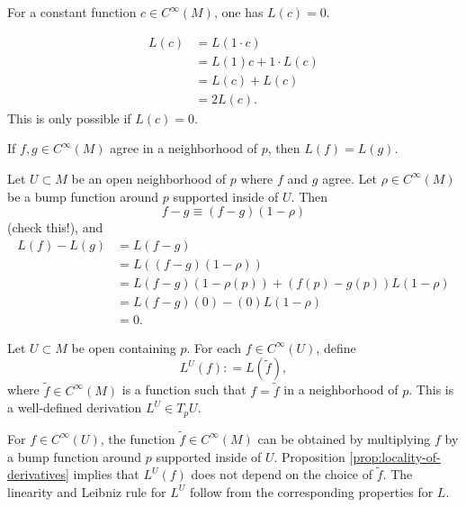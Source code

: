 \documentclass{ximera}
\begin{document}
    \begin{proposition}
        For a constant function $c \in C^{\infty}(M)$, one has $L (c) = 0$. 

    \begin{solution}
        \begin{align*}
            L(c) & = L ( 1 \cdot c) \\
            & = L (1) c + 1 \cdot  L (c) \\
            & =  L (c) +  L (c) \\
            & = 2 L (c) .
        \end{align*}
        This is only possible if $L(c) = 0$.
    \end{solution}
    \end{proposition}
    
    \begin{proposition}[Locality] \label{prop:locality-of-derivatives}
        If $f,g \in C^{\infty} (M)$ agree in a neighborhood of $p$, then $L(f) = L (g)$.
    \begin{solution}
        Let $U \subset M$ be an open neighborhood of $p$ where $f$ and $g$ agree. Let $\rho \in C^{\infty} (M)$ be a bump function around $p$ supported inside of $U$. Then 
        \[ f-g \equiv (f -g) ( 1 - \rho ) \] 
        (check this!), and
        \begin{align*}
            L( f) - L (g) & = L (f-g) \\
            & = L ((f - g) ( 1 - \rho ) ) \\
            & = L (f-g) ( 1 - \rho (p) )  + (f(p) - g(p)) L(1 - \rho) \\
            & = L(f-g) (0) - (0) L (1 - \rho ) \\
            & = 0. 
        \end{align*}
    \end{solution} 
    \end{proposition}

    \begin{proposition}\label{prop:restriction-of-derivatives}
        Let $ U \subset M$ be open containing $p$. For each $f\in C^{\infty}(U)$, define 
        \[   L^U (f) : = L (\tilde{f}) ,     \]
        where $\tilde{f} \in C^{\infty} (M) $ is a function such that $f = \tilde{f} $ in a neighborhood of $p$. This is a well-defined derivation $L^U  \in T_p U $.

    \begin{solution}
        For $f \in C^{\infty} (U)$, the function $\tilde{f} \in C^{\infty}(M)$ can be obtained by multiplying $f$ by a bump function around $p$ supported inside of $U$. Proposition \ref{prop:locality-of-derivatives} implies that $L^U (f) $ does not depend on the choice of $\tilde{f}$. The linearity and Leibniz rule for $L^U$ follow from the corresponding properties for $L$.  
    \end{solution} 
    \end{proposition}
\end{document}
